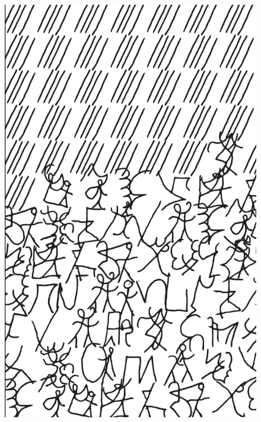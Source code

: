 \makeatletter\@openrightfalse
\movetooddpage
\begin{absolutelynopagebreak}
\begin{vplace}
\begin{figure}[H]
\begin{adjustwidth}{-0.99cm}{}
  \centering
  \vspace*{-1.97cm}
  \hspace*{-0.65cm}
  \includegraphics[width=115mm]{./imgs/img5.pdf}  
  \hfill
\end{adjustwidth}

\thispagestyle{empty}

\end{figure}
\end{vplace}

\end{absolutelynopagebreak}

